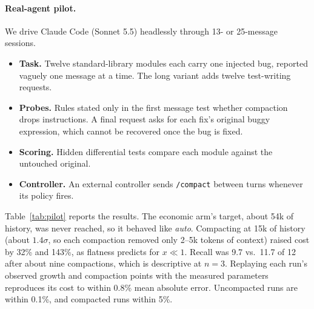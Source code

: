 \documentclass[11pt]{article}
\begin{document}
\begin{table}[t]
\centering
\small
\caption{Stress-test ratios (cost / offline optimum) over every prefix of 150 sessions drawn from steady, heavy-tailed and switching growth families.}
\label{tab:worst}

\end{table}

\paragraph{Real-agent pilot.} We drive Claude Code (Sonnet 5.5) headlessly through 13- or 25-message sessions.
\begin{itemize}
\item \textbf{Task.} Twelve standard-library modules each carry one injected bug, reported vaguely one message at a time. The long variant adds twelve test-writing requests.
\item \textbf{Probes.} Rules stated only in the first message test whether compaction drops instructions. A final request asks for each fix's original buggy expression, which cannot be recovered once the bug is fixed.
\item \textbf{Scoring.} Hidden differential tests compare each module against the untouched original.
\item \textbf{Controller.} An external controller sends \texttt{/compact} between turns whenever its policy fires.
\end{itemize}
Table~\ref{tab:pilot} reports the results. The economic arm's target, about 54k of history, was never reached, so it behaved like \emph{auto}. Compacting at 15k of history (about $1.4\sigma$, so each compaction removed only 2--5k tokens of context) raised cost by 32\% and 143\%, as flatness predicts for $x\ll1$. Recall was 9.7 vs.\ 11.7 of 12 after about nine compactions, which is descriptive at $n=3$. Replaying each run's observed growth and compaction points with the measured parameters reproduces its cost to within 0.8\% mean absolute error. Uncompacted runs are within 0.1\%, and compacted runs within 5\%.
\end{document}
